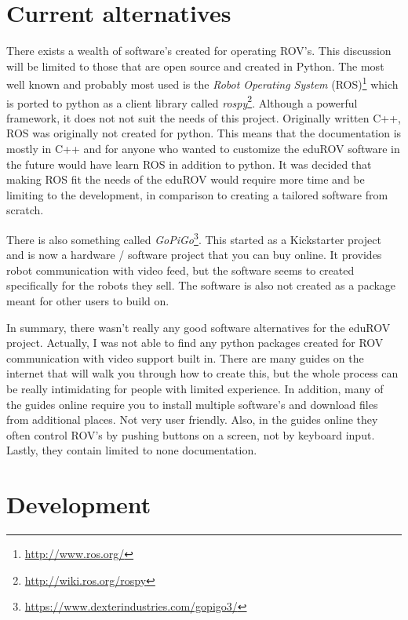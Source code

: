 \section{Current alternatives}

There exists a wealth of software's created for operating ROV's. This discussion will be limited to those that are open source and created in Python. The most well known and probably most used is the \emph{Robot Operating System} (ROS)\footnote{\url{http://www.ros.org/}} which is ported to python as a client library called \emph{rospy}\footnote{\url{http://wiki.ros.org/rospy}}. Although a powerful framework, it does not not suit the needs of this project. Originally written C++, ROS was originally not created for python. This means that the documentation is mostly in C++ and for anyone who wanted to customize the eduROV software in the future would have learn ROS in addition to python. It was decided that making ROS fit the needs of the eduROV would require more time and be limiting to the development, in comparison to creating a tailored software from scratch.

There is also something called \emph{GoPiGo}\footnote{\url{https://www.dexterindustries.com/gopigo3/}}. This started as a Kickstarter project and is now a hardware / software project that you can buy online. It provides robot communication with video feed, but the software seems to created specifically for the robots they sell. The software is also not created as a package meant for other users to build on.

In summary, there wasn't really any good software alternatives for the eduROV project. Actually, I was not able to find any python packages created for ROV communication with video support built in. There are many guides on the internet that will walk you through how to create this, but the whole process can be really intimidating for people with limited experience. In addition, many of the guides online require you to install multiple software's and download files from additional places. Not very user friendly. Also, in the guides online they often control ROV's by pushing buttons on a screen, not by keyboard input. Lastly, they contain limited to none documentation.

\section{Development}

